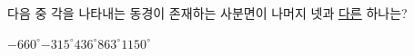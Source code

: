 다음 중 각을 나타내는 동경이 존재하는 사분면이 나머지 넷과 \underline{다른} 하나는?
\begin{choices32}{$-660^\circ$}{$-315^\circ$}{$436^\circ$}{$863^\circ$}{$1150^\circ$}\end{choices32}
